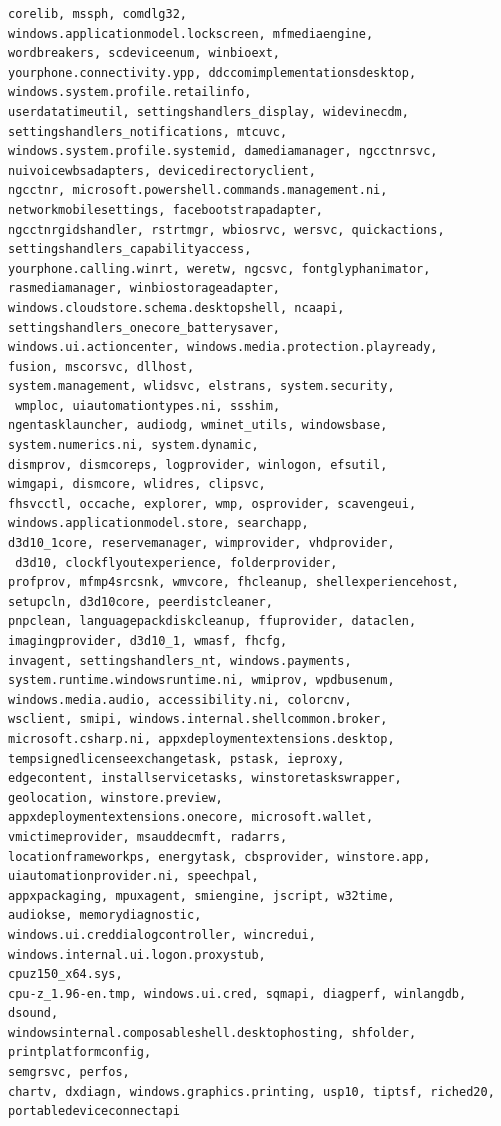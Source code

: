 \documentclass[a4paper,twoside,12pt]{book}
\begin{document}
\begin{appendices}
\begin{lstlisting}[label={lst:dlls},caption={All gathered DLL's},escapeinside=``,basicstyle=\tiny,breaklines=true]
corelib, mssph, comdlg32, 
windows.applicationmodel.lockscreen, mfmediaengine, 
wordbreakers, scdeviceenum, winbioext, 
yourphone.connectivity.ypp, ddccomimplementationsdesktop, 
windows.system.profile.retailinfo, 
userdatatimeutil, settingshandlers_display, widevinecdm, 
settingshandlers_notifications, mtcuvc, 
windows.system.profile.systemid, damediamanager, ngcctnrsvc, 
nuivoicewbsadapters, devicedirectoryclient, 
ngcctnr, microsoft.powershell.commands.management.ni, 
networkmobilesettings, facebootstrapadapter, 
ngcctnrgidshandler, rstrtmgr, wbiosrvc, wersvc, quickactions, settingshandlers_capabilityaccess, 
yourphone.calling.winrt, weretw, ngcsvc, fontglyphanimator, 
rasmediamanager, winbiostorageadapter, 
windows.cloudstore.schema.desktopshell, ncaapi, 
settingshandlers_onecore_batterysaver, 
windows.ui.actioncenter, windows.media.protection.playready, 
fusion, mscorsvc, dllhost, 
system.management, wlidsvc, elstrans, system.security,
 wmploc, uiautomationtypes.ni, ssshim, 
ngentasklauncher, audiodg, wminet_utils, windowsbase, 
system.numerics.ni, system.dynamic, 
dismprov, dismcoreps, logprovider, winlogon, efsutil, 
wimgapi, dismcore, wlidres, clipsvc, 
fhsvcctl, occache, explorer, wmp, osprovider, scavengeui, 
windows.applicationmodel.store, searchapp, 
d3d10_1core, reservemanager, wimprovider, vhdprovider,
 d3d10, clockflyoutexperience, folderprovider, 
profprov, mfmp4srcsnk, wmvcore, fhcleanup, shellexperiencehost, 
setupcln, d3d10core, peerdistcleaner, 
pnpclean, languagepackdiskcleanup, ffuprovider, dataclen, 
imagingprovider, d3d10_1, wmasf, fhcfg, 
invagent, settingshandlers_nt, windows.payments, 
system.runtime.windowsruntime.ni, wmiprov, wpdbusenum, 
windows.media.audio, accessibility.ni, colorcnv, 
wsclient, smipi, windows.internal.shellcommon.broker, 
microsoft.csharp.ni, appxdeploymentextensions.desktop, 
tempsignedlicenseexchangetask, pstask, ieproxy, 
edgecontent, installservicetasks, winstoretaskswrapper, 
geolocation, winstore.preview, 
appxdeploymentextensions.onecore, microsoft.wallet, 
vmictimeprovider, msauddecmft, radarrs, 
locationframeworkps, energytask, cbsprovider, winstore.app, 
uiautomationprovider.ni, speechpal, 
appxpackaging, mpuxagent, smiengine, jscript, w32time, 
audiokse, memorydiagnostic, 
windows.ui.creddialogcontroller, wincredui, windows.internal.ui.logon.proxystub, 
cpuz150_x64.sys, 
cpu-z_1.96-en.tmp, windows.ui.cred, sqmapi, diagperf, winlangdb, dsound, 
windowsinternal.composableshell.desktophosting, shfolder, printplatformconfig, 
semgrsvc, perfos, 
chartv, dxdiagn, windows.graphics.printing, usp10, tiptsf, riched20, 
portabledeviceconnectapi
\end{lstlisting}


\end{appendices}
\end{document}
